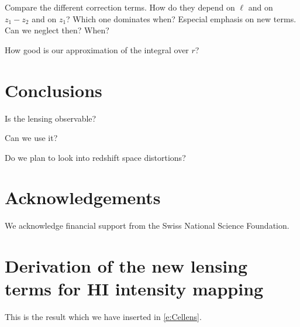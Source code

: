 \documentclass[a4paper,11pt]{article}
\def\bea{\begin{eqnarray}}
\def\eea{\end{eqnarray}}
\def\l {\langle}
\def\re {\rangle}
\def \De {\Delta}
\def \DH {\Delta_{\rm HI}}
\newcommand{\de}{\delta}
\def \Om {\Omega}
\newcommand{\bell}{\boldsymbol{\ell}}
\begin{document}
Compare the different correction terms. How do they depend on $\ell$ and on $z_1-z_2$ and on $z_1$? Which one dominates when? Especial emphasis on new terms. Can we neglect then? When?

How good is our approximation of the integral over $r$?

\section{Conclusions}
\label{Sec4}
Is the lensing observable?

Can we use it?

Do we plan to look into redshift space distortions?

\setcounter{equation}{0}

 
\section*{Acknowledgements}

We acknowledge financial support from the Swiss National Science Foundation.


\appendix
\section{Derivation of the new lensing terms for HI intensity mapping\label{a:derCl-new}}

This is the result which we have inserted in \eqref{e:Cellens}.
%


\end{document}
